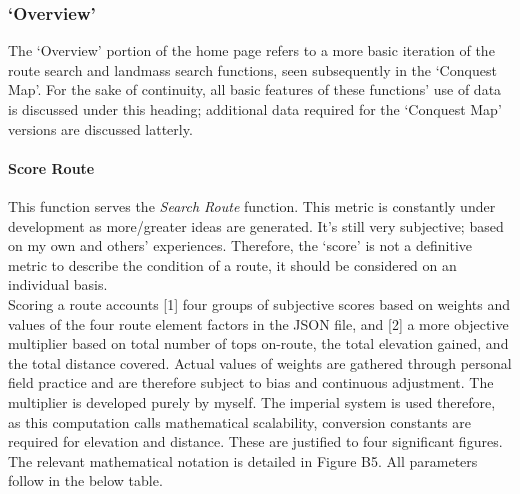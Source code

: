 \documentclass[11pt, english]{article}
\begin{document}
		\subsubsection{`Overview'}

	The `Overview' portion of the home page refers to a more basic iteration of the route search and landmass search functions, seen subsequently in the `Conquest Map'. For the sake of continuity, all basic features of these functions' use of data is discussed under this heading; additional data required for the `Conquest Map' versions are discussed latterly.

			\paragraph{Score Route}

	This function serves the \textit{Search Route} function. This metric is constantly under development as more/greater ideas are generated. It's still very subjective; based on my own and others' experiences. Therefore, the `score' is not a definitive metric to describe the condition of a route, it should be considered on an individual basis.\\

	Scoring a route accounts [1] four groups of subjective scores based on weights and values of the four route element factors in the JSON file, and [2] a more objective multiplier based on total number of tops on-route, the total elevation gained, and the total distance covered. Actual values of weights are gathered through personal field practice and are therefore subject to bias and continuous adjustment. The multiplier is developed purely by myself. The imperial system is used therefore, as this computation calls mathematical scalability, conversion constants are required for elevation and distance. These are justified to four significant figures. The relevant mathematical notation is detailed in Figure B5. All parameters follow in the below table.
\end{document}
